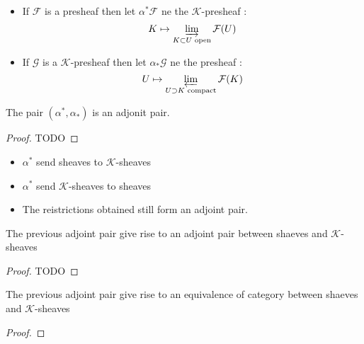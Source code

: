 \begin{definition}
    \label{def:adj_kprshv_and_prshv}
    \begin{itemize}
        \item If $\mathcal{F}$ is a presheaf then let $\alpha^*\mathcal{F}$ ne the $\mathcal{K}$-presheaf :\[K\mapsto \varinjlim\limits_{K\subset U \text{ open}}\mathcal{F}(U)\]
        \item If $\mathcal{G}$ is a $\mathcal{K}$-presheaf then let $\alpha_*\mathcal{G}$ ne the presheaf :\[ U\mapsto \varprojlim\limits_{U\supset K \text{ compact}}\mathcal{F}(K)\]
    \end{itemize}
\end{definition}

\begin{proposition}
    \label{pro:adj_kprshv_and_prshv}
    The pair $(\alpha^*,\alpha_*)$ is an adjonit pair.
\end{proposition}

\begin{proof}
    TODO
\end{proof}

\begin{lemma}
    \label{lem:adj_kshv_and_shv}
    \begin{itemize}
        \item $\alpha^*$ send sheaves to $\mathcal{K}$-sheaves
        \item $\alpha^*$ send $\mathcal{K}$-sheaves to sheaves
        \item The reistrictions obtained still form an adjoint pair.
    \end{itemize}
    The previous adjoint pair give rise to an adjoint pair between shaeves and $\mathcal{K}$-sheaves
\end{lemma}

\begin{proof}
    TODO
\end{proof}

\begin{lemma}
    \label{lem:kshv_equiv_shv}
    The previous adjoint pair give rise to an equivalence of category between shaeves and $\mathcal{K}$-sheaves
\end{lemma}

\begin{proof}

\end{proof}








